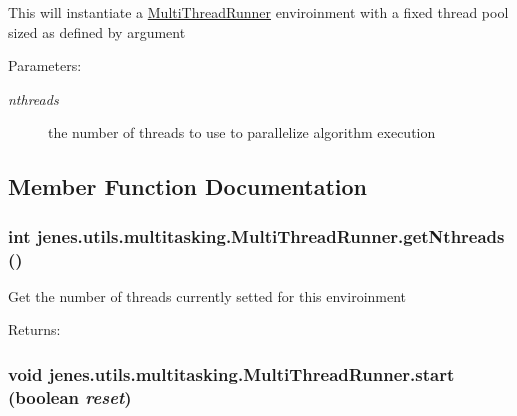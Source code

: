 This will instantiate a \hyperlink{classjenes_1_1utils_1_1multitasking_1_1_multi_thread_runner}{MultiThreadRunner} enviroinment with a fixed thread pool sized as defined by argument \begin{Desc}
\item[Parameters:]
\begin{description}
\item[{\em nthreads}]the number of threads to use to parallelize algorithm execution \end{description}
\end{Desc}


\subsection{Member Function Documentation}
\hypertarget{classjenes_1_1utils_1_1multitasking_1_1_multi_thread_runner_69370630a898026070fe8e806cec8fe0}{
\subsubsection[getNthreads]{\setlength{\rightskip}{0pt plus 5cm}int jenes.utils.multitasking.MultiThreadRunner.getNthreads ()}}
\label{classjenes_1_1utils_1_1multitasking_1_1_multi_thread_runner_69370630a898026070fe8e806cec8fe0}


Get the number of threads currently setted for this enviroinment \begin{Desc}
\item[Returns:]\end{Desc}
\hypertarget{classjenes_1_1utils_1_1multitasking_1_1_multi_thread_runner_52fc59a28c3187e84b871b9b823b7f43}{
\subsubsection[start]{\setlength{\rightskip}{0pt plus 5cm}void jenes.utils.multitasking.MultiThreadRunner.start (boolean {\em reset})}}
\label{classjenes_1_1utils_1_1multitasking_1_1_multi_thread_runner_52fc59a28c3187e84b871b9b823b7f43}


